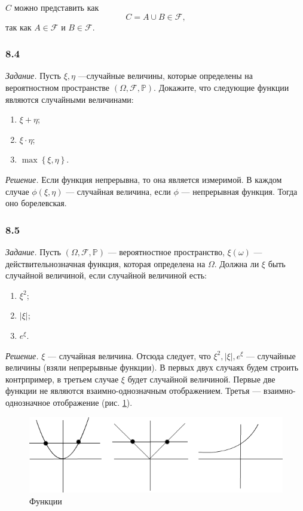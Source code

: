 $C$ можно представить как
$$C =
A \cup B \in \mathcal{F},$$
так как $A \in \mathcal{F} $ и $B \in \mathcal{F} $.

\subsubsection*{8.4}

\textit{Задание.} Пусть $ \xi, \eta $ ---случайные величины, которые определены на вероятностном пространстве $ \left( \Omega, \mathcal{F}, \mathbb{P} \right) $.
Докажите, что следующие функции являются случайными величинами:
\begin{enumerate}[label=\alph*)]
\item $ \xi + \eta $;
\item $ \xi \cdot \eta $;
\item $ \max \left\{ \xi, \eta \right\} $. 
\end{enumerate}

\textit{Решение.} Если функция непрерывна, то она является измеримой.
В каждом случае $ \phi \left( \xi, \eta \right) $ --- случайная величина, если $ \phi $ --- непрерывная функция.
Тогда оно борелевская.

\subsubsection*{8.5}

\textit{Задание.}
Пусть $ \left( \Omega, \mathcal{F}, \mathbb{P} \right) $ ---
вероятностное пространство, $ \xi \left( \omega \right) $ --- действительнозначная функция, которая определена на $ \Omega $.
Должна ли $ \xi $ быть случайной величиной, если случайной величиной есть:
\begin{enumerate}[label=\alph*)]
\item $ \xi^2 $;
\item $ \left| \xi \right| $;
\item $ e^{ \xi } $. 
\end{enumerate}

\textit{Решение.} $ \xi $ --- случайная величина.
Отсюда следует, что $ \xi^2, \left| \xi \right|, e^{ \xi }$ --- случайные величины (взяли непрерывные функции).
В первых двух случаях будем строить контрпример, в третьем случае $ \xi $ будет случайной величиной.
Первые две функции не являются взаимно-однозначным отображением.
Третья --- взаимно-однозначное отображение (рис. \ref{fig:85}).

\begin{figure}[h!]
  \centering
  \includegraphics[width=.4\textwidth]{./pictures/8_5.png}
  \caption{Функции}
  \label{fig:85}
\end{figure}


